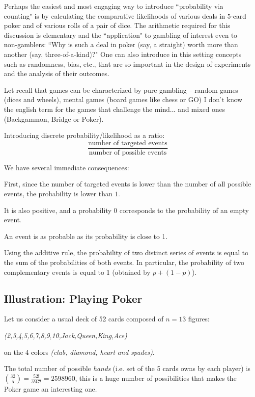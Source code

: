 Perhaps the easiest and most engaging way to introduce ``probability
via counting" is by calculating the comparative likelihoods of various
deals in $5$-card poker and of various rolls of a pair of dice.  The
arithmetic required for this discussion is elementary and the
``application" to gambling of interest even to non-gamblers: ``Why is
such a deal in poker (say, a straight) worth more than another (say,
three-of-a-kind)?"  One can also introduce in this setting concepts
such as randomness, bias, etc., that are so important in the design of
experiments and the analysis of their outcomes.

Let recall that games can be characterized by pure gambling -- random games (dices and wheels), 
mental games (board games like chess or GO)
 {\Denis I don't know the english term for the games that challenge the mind...} 
and mixed ones (Backgammon, Bridge or Poker).
\medskip

Introducing discrete probability/likelihood as a ratio:
\[ 
\frac{\mbox{number of targeted events}}{\mbox{number of possible events}}
\]

We have several immediate consequences:

First, since the number of targeted events is lower than the number of all possible events,
the probability is lower than $1$. 

It is also positive, and a probability $0$ corresponds to the probability of an empty event.

An event is as probable as its probability is close to 1.

Using the additive rule, the probability of two distinct series of events is equal to the sum of the probabilities
of both events. 
In particular, the probability of two complementary events is equal to 1 (obtained by $p + (1-p)$).


\subsection{Illustration: Playing Poker}

Let us consider a usual deck of 52 cards composed of $n=13$ figures:

\textit{(2,3,4,5,6,7,8,9,10,Jack,Queen,King,Ace)} 

on the 4 colors \textit{(club, diamond, heart and spades)}.

The total number of possible \textit{hands} (i.e. set of the 5 cards owns by each player) is 
${32 \choose 5} = \frac{52!}{5! 47!} = 2 598 960$, this is a huge number of possibilities that makes the Poker game an interesting one.

